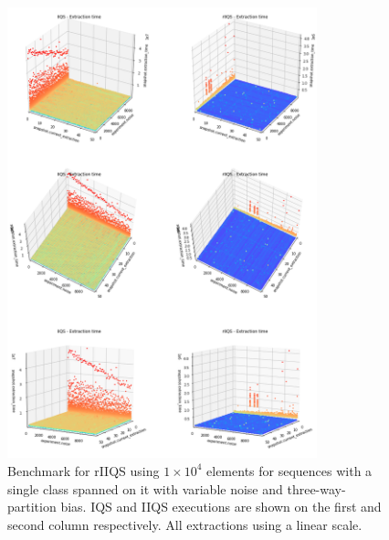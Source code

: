 \begin{figure}[!ht]
    \centering
    \includegraphics[width=0.8\textwidth]{./fragments/05_workhorse_experiment/images/01_basebenchmark_06_noise_bias.png}
    \caption{Benchmark for rIIQS using $1\times10^4$ elements for sequences with a single class spanned on it with variable noise and three-way-partition bias. IQS and IIQS executions are shown on the first and second column respectively. All extractions using a linear scale.}
    \label{FIG:WORKHORSE_BENCHMARK_07}
\end{figure}
